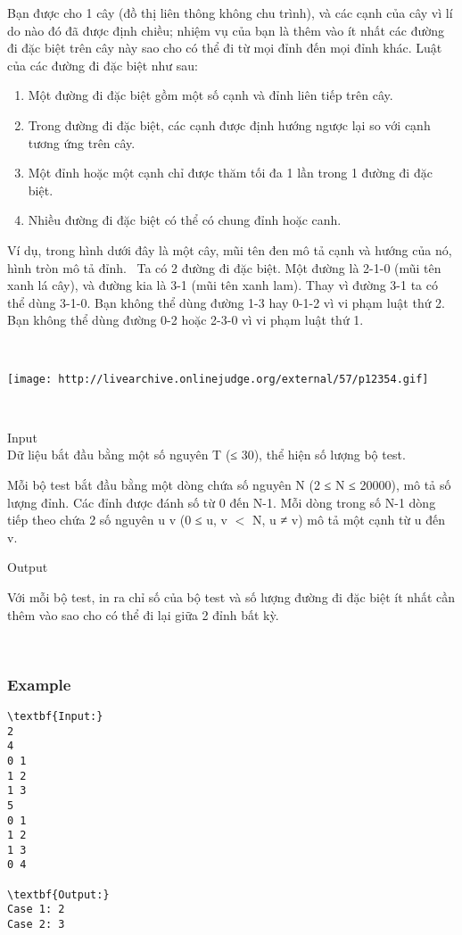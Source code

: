 

Bạn được cho 1 cây (đồ thị liên thông không chu trình), và các cạnh của cây vì lí do nào đó đã được định chiều; nhiệm vụ của bạn là thêm vào ít nhất các đường đi đặc biệt trên cây này sao cho có thể đi từ mọi đỉnh đến mọi đỉnh khác. Luật của các đường đi đặc biệt như sau:
\begin{enumerate}
	\item 

Một đường đi đặc biệt gồm một số cạnh và đỉnh liên tiếp trên cây.
	\item 

Trong đường đi đặc biệt, các cạnh được định hướng ngược lại so với cạnh tương ứng trên cây.
	\item 

Một đỉnh hoặc một cạnh chỉ được thăm tối đa 1 lần trong 1 đường đi đặc biệt.
	\item 

Nhiều đường đi đặc biệt có thể có chung đỉnh hoặc canh.
\end{enumerate}

Ví dụ, trong hình dưới đây là một cây, mũi tên đen mô tả cạnh và hướng của nó, hình tròn mô tả đỉnh.  Ta có 2 đường đi đặc biệt. Một đường là 2-1-0 (mũi tên xanh lá cây), và đường kia là 3-1 (mũi tên xanh lam). Thay vì đường 3-1 ta có thể dùng 3-1-0. Bạn không thể dùng đường 1-3 hay 0-1-2 vì vi phạm luật thứ 2. Bạn không thể dùng đường 0-2 hoặc 2-3-0 vì vi phạm luật thứ 1.

 


\texttt{[image: http://livearchive.onlinejudge.org/external/57/p12354.gif]}

 

Input
\\Dữ liệu bắt đầu bằng một số nguyên T (≤ 30), thể hiện số lượng bộ test.

Mỗi bộ test bắt đầu bằng một dòng chứa số nguyên N (2 ≤ N ≤ 20000), \textbf{} mô tả số lượng đỉnh. Các đỉnh được đánh số từ 0 đến N-1. Mỗi dòng trong số N-1 dòng tiếp theo chứa 2 số nguyên u v (0 ≤ u, v $<$ N, u ≠ v) mô tả một cạnh từ u đến v.

Output

Với mỗi bộ test, in ra chỉ số của bộ test và số lượng đường đi đặc biệt ít nhất cần thêm vào sao cho có thể đi lại giữa 2 đỉnh bất kỳ.

 

\subsubsection{Example}
\begin{verbatim}
\textbf{Input:}
2 
4 
0 1
1 2 
1 3 
5 
0 1 
1 2 
1 3 
0 4 

\textbf{Output:}
Case 1: 2
Case 2: 3\end{verbatim}